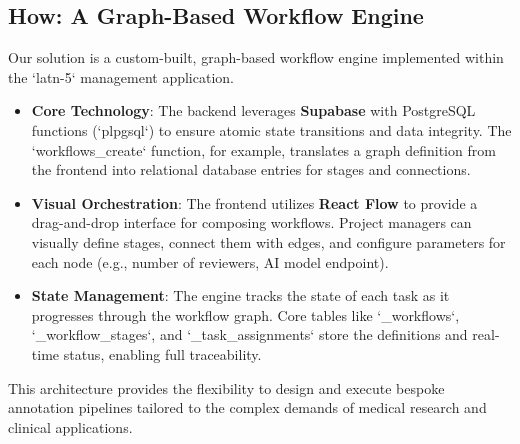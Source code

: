 \subsection{How: A Graph-Based Workflow Engine}
Our solution is a custom-built, graph-based workflow engine implemented within the `latn-5` management application.
\begin{itemize}
    \item \textbf{Core Technology}: The backend leverages \textbf{Supabase} with PostgreSQL functions (`plpgsql`) to ensure atomic state transitions and data integrity. The `workflows_create` function, for example, translates a graph definition from the frontend into relational database entries for stages and connections.
    \item \textbf{Visual Orchestration}: The frontend utilizes \textbf{React Flow} to provide a drag-and-drop interface for composing workflows. Project managers can visually define stages, connect them with edges, and configure parameters for each node (e.g., number of reviewers, AI model endpoint).
    \item \textbf{State Management}: The engine tracks the state of each task as it progresses through the workflow graph. Core tables like `_workflows`, `_workflow_stages`, and `_task_assignments` store the definitions and real-time status, enabling full traceability.
\end{itemize}
This architecture provides the flexibility to design and execute bespoke annotation pipelines tailored to the complex demands of medical research and clinical applications. 